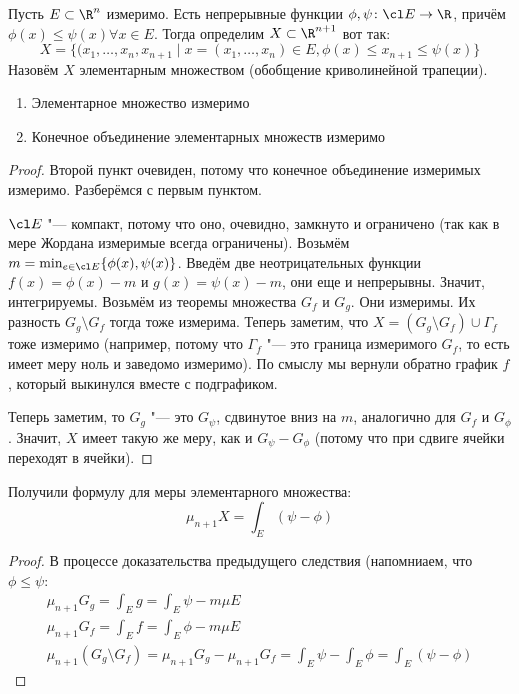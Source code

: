\begin{Def}
	Пусть $E \subset \R^n$ измеримо.
	Есть непрерывные функции $\phi, \psi \colon \cl E \to \R$,
	причём $\phi(x) \le \psi(x) \forall x \in E$.
	Тогда определим $X \subset \R^{n+1}$ вот так:
	\[
	X = \{ (x_1, \dots, x_n, x_{n+1} \mid x=(x_1, \dots, x_n) \in E, \phi(x) \le x_{n+1} \le \psi(x) \}
	\]
	Назовём $X$ элементарным множеством (обобщение криволинейной трапеции).
\end{Def}
\begin{conseq}
	\begin{enumerate}
	\item Элементарное множество измеримо
	\item Конечное объединение элементарных множеств измеримо
	\end{enumerate}
\end{conseq}
\begin{proof}
	Второй пункт очевиден, потому что конечное объединение измеримых измеримо.
	Разберёмся с первым пунктом.

	$\cl E$ "--- компакт, потому что оно, очевидно, замкнуто и ограничено (так как в мере Жордана измеримые всегда ограничены).
	Возьмём $m = \min_{e \in \cl E} \{ \phi(x), \psi(x) \}$.
	Введём две неотрицательных функции $f(x) = \phi(x) - m$ и $g(x) = \psi(x) - m$, они еще и непрерывны.
	Значит, интегрируемы.
	Возьмём из теоремы множества $G_f$ и $G_g$.
	Они измеримы.
	Их разность $G_g \setminus G_f$ тогда тоже измерима.
	Теперь заметим, что $X=(G_g \setminus G_f) \cup \Gamma_f$ тоже измеримо (например, потому что $\Gamma_f$ "--- это граница измеримого $G_f$, то есть имеет меру ноль и заведомо измеримо).
	По смыслу мы вернули обратно график $f$, который выкинулся вместе с подграфиком.
	
	Теперь заметим, то $G_g$ "--- это $G_\psi$, сдвинутое вниз на $m$, аналогично для $G_f$ и $G_\phi$.
	Значит, $X$ имеет такую же меру, как и $G_\psi - G_\phi$ (потому что при сдвиге ячейки переходят в ячейки).
\end{proof}
\begin{conseq}
	Получили формулу для меры элементарного множества:
	\[
	\mu_{n+1} X = \int_E (\psi - \phi)
	\]
\end{conseq}
\begin{proof}
	В процессе доказательства предыдущего следствия (напомниаем, что $\phi \le \psi$:
	\begin{gather*}
	\mu_{n+1} G_g = \int_E g = \int_E \psi - m \mu E \\
	\mu_{n+1} G_f = \int_E f = \int_E \phi - m \mu E \\
	\mu_{n+1} (G_g \setminus G_f) = \mu_{n+1} G_g - \mu_{n+1} G_f = \int_E \psi - \int_E \phi = \int_E (\psi - \phi)
	\end{gather*}
\end{proof}

